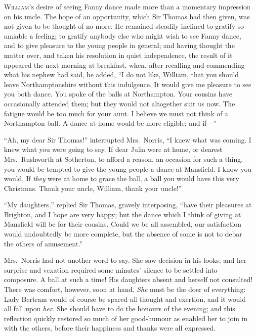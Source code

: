\documentclass{article}
\newcommand{\gintro}[1]{\textcolor{gcolor}{\textsc{#1}}}
\begin{document}
\gintro{William's} desire of seeing Fanny dance made more than a
momentary impression on his uncle.  The hope of an opportunity,
which Sir Thomas had then given, was not given to be thought
of no more.  He remained steadily inclined to gratify
so amiable a feeling; to gratify anybody else who might
wish to see Fanny dance, and to give pleasure to the young
people in general; and having thought the matter over,
and taken his resolution in quiet independence,
the result of it appeared the next morning at breakfast,
when, after recalling and commending what his nephew
had said, he added, ``I do not like, William, that you
should leave Northamptonshire without this indulgence.
It would give me pleasure to see you both dance.
You spoke of the balls at Northampton.  Your cousins have
occasionally attended them; but they would not altogether
suit us now.  The fatigue would be too much for your aunt.
I believe we must not think of a Northampton ball.
A dance at home would be more eligible; and if---''

``Ah, my dear Sir Thomas!'' interrupted Mrs.\ Norris, ``I knew
what was coming.  I knew what you were going to say.  If dear
Julia were at home, or dearest Mrs.\ Rushworth at Sotherton,
to afford a reason, an occasion for such a thing, you would
be tempted to give the young people a dance at Mansfield.
I know you would.  If \emph{they} were at home to grace
the ball, a ball you would have this very Christmas.
Thank your uncle, William, thank your uncle!''

``My daughters,'' replied Sir Thomas, gravely interposing,
``have their pleasures at Brighton, and I hope are very happy;
but the dance which I think of giving at Mansfield
will be for their cousins.  Could we be all assembled,
our satisfaction would undoubtedly be more complete,
but the absence of some is not to debar the others
of amusement.''

Mrs.\ Norris had not another word to say.  She saw decision
in his looks, and her surprise and vexation required
some minutes' silence to be settled into composure.
A ball at such a time!  His daughters absent and herself
not consulted!  There was comfort, however, soon at hand.
\emph{She} must be the doer of everything:  Lady Bertram
would of course be spared all thought and exertion,
and it would all fall upon \emph{her}.  She should have to do
the honours of the evening; and this reflection quickly
restored so much of her good-humour as enabled her to join
in with the others, before their happiness and thanks were
all expressed.
\end{document}
